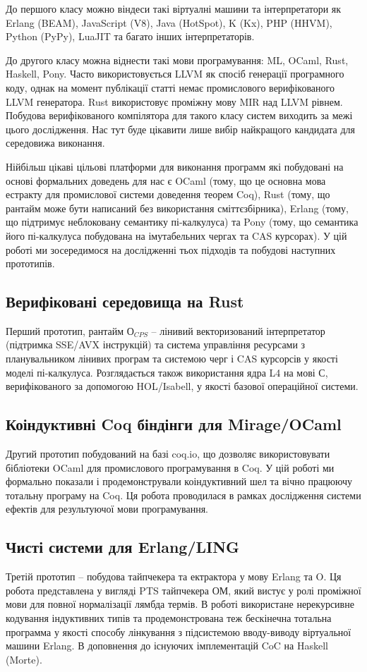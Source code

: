 До першого класу можно віндеси такі віртуалні машини та інтерпретатори як
Erlang (BEAM), JavaScript (V8), Java (HotSpot), K (Kx), PHP (HHVM), Python (PyPy), LuaJIT
та багато інших інтерпретаторів.

До другого класу можна віднести такі мови програмування: ML, OCaml, Rust,
Haskell, Pony. Часто використовується LLVM як спосіб генерації програмного коду,
однак на момент публікації статті немає промислового верифікованого LLVM генератора.
Rust використовує проміжну мову MIR над LLVM рівнем. Побудова верифікованого компілятора
для такого класу систем виходить за межі цього дослідження. Нас тут буде цікавити
лише вибір найкращого кандидата для середовижа виконання.

Нійбільш цікаві цільові платформи для виконання программ
які побудовані на основі формальних доведень для нас є OCaml (тому,
що це основна мова естракту для промислової системи доведення теорем Coq),
Rust (тому, що рантайм може бути написаний без використання сміттєзбірника),
Erlang (тому, що підтримує неблоковану семантику пі-калкулуса)
та Pony (тому, що семантика його пі-калкулуса побудована на
імутабельних чергах та CAS курсорах).
У цій роботі ми зосередимося на дослідженні тьох підходів
та побудові наступних прототипів.

\subsection{Верифіковані середовища на Rust}
Перший прототип, рантайм $О_{CPS}$ -- лінивий
векторизований інтерпретатор (підтримка SSE/AVX інструкцій) та система
управління ресурсами з планувальником лінивих програм
та системою черг і CAS курсорсів у якості моделі пі-калкулуса. Розглядається також
використання ядра L4 на мові С, верифікованого за допомогою HOL/Isabell,
у якості базової операційної системи.

\subsection{Коіндуктивні Coq біндінги для Mirage/OCaml}
Другий прототип побудований на базі coq.io, що дозволяє
використовувати бібліотеки OCaml для промислового програмування в Coq.
У цій роботі ми формально показали і продемонстрували коіндуктивний шел
та вічно працюючу тотальну програму на Coq. Ця робота проводилася
в рамках дослідження системи ефектів для результуючої мови програмування.

\subsection{Чисті системи для Erlang/LING}
Третій прототип -- побудова тайпчекера та ектрактора у мову Erlang та O.
Ця робота представлена у вигляді PTS тайпчекера ОМ, який вистує у ролі
проміжної мови для повної нормалізації лямбда термів. В роботі використане
нерекурсивне кодування індуктивних типів та продемонстрована теж бескінечна
тотальна программа у якості способу лінкування з підсистемою вводу-виводу
віртуальної машини Erlang. В доповнення до існуючих імплементацій CoC
на Haskell (Morte).

